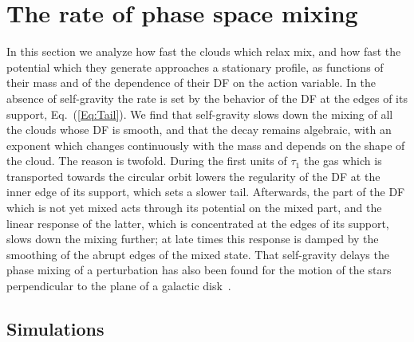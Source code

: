 \section{The rate of phase space mixing}
\label{Sec:Rates}

In this section we analyze how fast the clouds which relax mix, and how fast the potential which they generate approaches a stationary profile, as functions of their mass and of the dependence of their DF on the action variable. In the absence of self-gravity the rate is set by the behavior of the DF at the edges of its support, Eq.~(\ref{Eq:Tail}). We find that self-gravity slows down the mixing of all the clouds whose DF is smooth, and that the decay remains algebraic, with an exponent which changes continuously with the mass and depends on the shape of the cloud. The reason is twofold. During the first units of $\tau_1$ the gas which is transported towards the circular orbit lowers the regularity of the DF at the inner edge of its support, which sets a slower tail. Afterwards, the part of the DF which is not yet mixed acts through its potential on the mixed part, and the linear response of the latter, which is concentrated at the edges of its support, slows down the mixing further; at late times this response is damped by the smoothing of the abrupt edges of the mixed state. That self-gravity delays the phase mixing of a perturbation has also been found for the motion of the stars perpendicular to the plane of a galactic disk~\cite{kDlW19,lW23,tAtA26}.


\subsection{Simulations}
\label{SubSec:RatesRuns}


